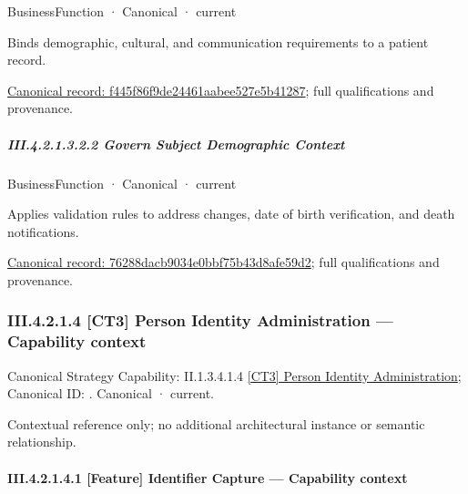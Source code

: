 \label{element:f445f86f9de24461aabee527e5b41287}
{\small BusinessFunction · Canonical · current}\par

Binds demographic, cultural, and communication requirements to a patient record.


{\footnotesize \href{../../../../continuum/business/business-function/f445f86f9de24461aabee527e5b41287.md}{Canonical record: f445f86f9de24461aabee527e5b41287}; full qualifications and provenance.}\par
\subparagraph*{III.4.2.1.3.2.2 Govern Subject Demographic Context}
\label{navigation:III.4.2.1.3.2.2}

\label{element:76288dacb9034e0bbf75b43d8afe59d2}
{\small BusinessFunction · Canonical · current}\par

Applies validation rules to address changes, date of birth verification, and death notifications.


{\footnotesize \href{../../../../continuum/business/business-function/76288dacb9034e0bbf75b43d8afe59d2.md}{Canonical record: 76288dacb9034e0bbf75b43d8afe59d2}; full qualifications and provenance.}\par
\subsubsection*{III.4.2.1.4 [CT3] Person Identity Administration — Capability context}
\label{navigation:III.4.2.1.4}

{\small Canonical Strategy Capability: II.1.3.4.1.4 \hyperref[element:6c3de7750ef1436cad6a9533731782b6]{[CT3] Person Identity Administration}; Canonical ID: \texttt{}. Canonical · current.}\par
Contextual reference only; no additional architectural instance or semantic relationship.\par
\paragraph*{III.4.2.1.4.1 [Feature] Identifier Capture — Capability context}
\label{navigation:III.4.2.1.4.1}

